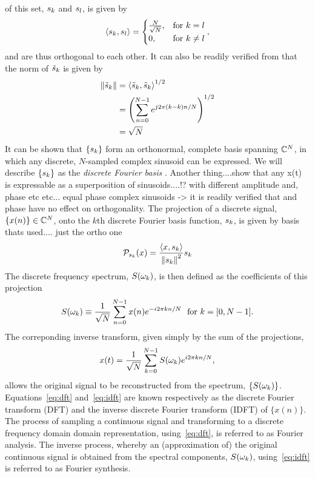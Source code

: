 of this set, $s_k$ and $s_l$, is given by
$$
\left< s_k, s_l \right> =
\begin{cases} \frac{N}{\sqrt{N}}, & \text{for}\ k = l \\ 0, & \text{for}\ k \ne
l
    \end{cases},
  $$
and are thus orthogonal to each other. It can also be readily verified from that
the norm of $\tilde{s}_k$ is given by
\begin{align*} \left\lVert\tilde{s}_k\right\rVert &= \left< \tilde{s}_k, \tilde{s}_k
\right>^{1/2} \\ &= \left( \sum_{n=0}^{N-1} e^{j 2 \pi(k-k) n / N} \right)^{1/2}
\\ &= \sqrt{N}
\end{align*} It can be shown that $\{ s_k \}$ form an orthonormal, complete
basis\cite{} spanning $\mathbb{C}^{N}$, in which any discrete, $N$-sampled
complex sinusoid can be expressed. We will describe $\{ s_k \}$ as the
\textit{ discrete Fourier basis }. Another thing....show that any x(t) is
expressable as a superposition of sinusoids....!? %
with different amplitude and, phase etc etc... %
equal %
phase complex sinusoids -> it is readily verified that %
and phase have no effect on orthogonality. The projection of a discrete signal,
$\{ x(n) \} \in \mathbb{C}^{N} $, onto the $k$th discrete Fourier basis
function, $s_k$, is given by %
basis thats used.... just the ortho one
\begin{equation} \mathcal{P}_{s_k} (x) = \frac{ \left< x, s_k \right>
}{\left\lVert s_k\right\rVert^2} s_k \label{eq:projection-onto-basis}
\end{equation} The discrete frequency spectrum, $S(\omega_k)$, is then
defined as the coefficients of this projection
\begin{equation} S(\omega_k) \equiv \frac{1}{\sqrt{N}}\sum_{n=0}^{N-1}
x(n) e^{-i 2 \pi k n / N}\ \ \textrm{for}\ k = [0,N-1]
  \label{eq:dft} .
\end{equation} The correponding inverse transform, given simply by the sum of
the projections,
\begin{equation} x(t) = \frac{1}{\sqrt{N}} \sum_{k=0}^{N-1} S(\omega_k)
e^{i 2 \pi k n / N}
  \label{eq:idft} ,
\end{equation} allows the original signal to be reconstructed from the spectrum,
$\{ S(\omega_k) \}$. %
Equations~\eqref{eq:dft} and~\eqref{eq:idft} are known respectively as the
discrete Fourier transform (DFT) and the inverse discrete Fourier transform
(IDFT) of $\{ x(n) \}$. The process of sampling a continuous signal and
transforming to a discrete frequency domain domain representation,
using~\eqref{eq:dft}, is referred to as Fourier analysis. The inverse process,
whereby an (approximation of) the original continuous signal is obtained from
the spectral components, $S(\omega_k)$, using~\eqref{eq:idft} is
referred to as Fourier synthesis. %

